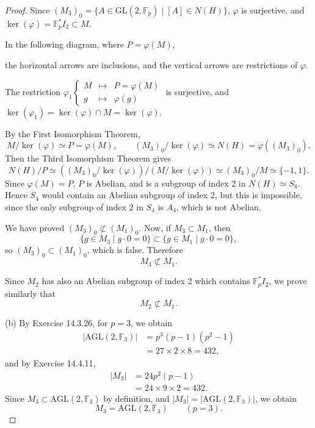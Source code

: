 \documentclass[11pt,a4paper]{article}
\newcommand{\F}{\mathbb{F}}
\begin{document}
{\begin{proof}
Since $(M_3)_0 = \{A \in \mathrm{GL}(2,\F_p) \mid [A] \in N(H)\}$, $\varphi$  is surjective, and $\ker(\varphi) = \F_p^* I_2 \subset M$.


In the following diagram, where $P = \varphi(M)$,
\begin{center}
\end{center}
the horizontal arrows are inclusions, and the vertical arrows are restrictions of $\varphi$.

The  restriction
$
\varphi_1
\left\{
\begin{array}{ccl}
M & \mapsto & P = \varphi(M)\\
g & \mapsto &\varphi(g)
\end{array}
\right.
$ is surjective, and $\ker(\varphi_1) = \ker(\varphi) \cap M = \ker(\varphi)$.

By the First Isomorphism Theorem,
$$ M/\ker(\varphi) \simeq P = \varphi(M),\qquad (M_3)_0/\ker(\varphi) \simeq N(H) = \varphi((M_3)_0).$$
Then the Third Isomorphism Theorem gives
$$N(H) / P \simeq ((M_3)_0/\ker(\varphi))/(M/\ker(\varphi) ) \simeq (M_3)_0/M \simeq \{-1,1\}.$$
Since $\varphi(M) = P$, $P$ is Abelian, and is a subgroup of index $2$ in  $N(H) \simeq S_4$. Hence $S_4$ would contain an Abelian subgroup of index 2, but this is impossible, since the only subgroup of index 2 in $S_4$ is $A_4$, which is not Abelian.

We have proved $(M_3)_0 \not \subset (M_1)_0$. Now, if $M_3 \subset M_1$, then $$\{g \in M_3 \mid g\cdot 0 = 0\} \subset \{g \in M_1 \mid g \cdot 0 = 0\},$$ so $(M_3)_0 \subset (M_1)_0$, which is false. Therefore
$$M_3 \not \subset M_1.$$

Since $M_2$ has also an Abelian subgroup of index 2 which contains $\F_p^* I_2$, we prove similarly that
$$M_2 \not \subset M_1.$$

\item[(b)] By Exercise 14.3.26, for $p=3$, we obtain
\begin{align*}
|\mathrm{AGL}(2,\F_3)| &= p^3(p-1)(p^2-1)\\
&=27 \times 2 \times 8 =432,
\end{align*}
and by Exercise 14.4.11,
\begin{align*}
|M_3| &= 24 p^2(p-1)\\
&= 24\times 9 \times 2 = 432.
\end{align*}
Since $M_3 \subset \mathrm{AGL}(2,\F_3)$ by definition, and $|M_3| = |\mathrm{AGL}(2,\F_3)|$, we obtain
$$M_3 = \mathrm{AGL}(2,\F_3) \qquad (p=3).$$


\end{proof}}
\end{document}
